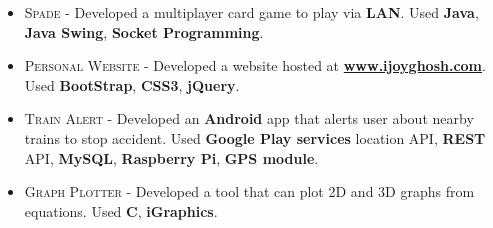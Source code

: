 \documentclass[letterpaper,10pt]{article}
\begin{document}
\begin{itemize}
    \item \textsc{Spade} - 
        Developed a multiplayer card game to play via \textbf{LAN}.
        Used \textbf{Java}, \textbf{Java Swing}, \textbf{Socket Programming}.
    
    \item \textsc{Personal Website} - 
        Developed a website hosted at \href{http://www.ijoyghosh.com}{\textbf{www.ijoyghosh.com}}.
        Used \textbf{BootStrap}, \textbf{CSS3}, \textbf{jQuery}.
    
    \item \textsc{Train Alert} - 
        Developed an \textbf{Android} app that alerts user about nearby trains to stop accident.
        Used \textbf{Google Play services} location API, \textbf{REST} API, \textbf{MySQL}, \textbf{Raspberry Pi}, \textbf{GPS module}.
    
   
   \item \textsc{Graph Plotter} - 
       Developed a tool that can plot \textsc{2D} and \textsc{3D} graphs from equations.
       Used \textbf{C}, \textbf{iGraphics}.
   

\end{itemize}
\end{document}
